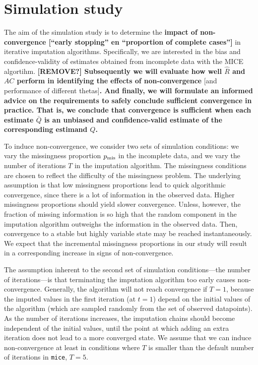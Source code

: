 \documentclass[Royal,times,sageh]{sagej}
\begin{document}
\hypertarget{simulation-study}{%
\section{Simulation study}\label{simulation-study}}

The aim of the simulation study is to determine the \textbf{impact of non-convergence {[}``early stopping'' en ``proportion of complete cases''{]}} in iterative imputation algorithms. Specifically, we are interested in the bias and confidence-validity of estimates obtained from incomplete data with the MICE algortihm. \textbf{{[}REMOVE?{]} Subsequently we will evaluate how well \(\widehat{R}\) and \(AC\) perform in identifying the effects of non-convergence }{[}and performance of different thetas{]}\textbf{. And finally, we will formulate an informed advice on the requirements to safely conclude sufficient convergence in practice. That is, we conclude that convergence is sufficient when each estimate \(\bar{Q}\) is an unbiased and confidence-valid estimate of the corresponding estimand \(Q\).}

To induce non-convergence, we consider two sets of simulation conditions: we vary the missingness proportion \(p_{\rm mis}\) in the incomplete data, and we vary the number of iterations \(T\) in the imputation algorithm. The missingness conditions are chosen to reflect the difficulty of the missingness problem. The underlying assumption is that low missingness proportions lead to quick algorithmic convergence, since there is a lot of information in the observed data. Higher missingness proportions should yield slower convergence. Unless, however, the fraction of missing information is so high that the random component in the imputation algorithm outweighs the information in the observed data. Then, convergence to a stable but highly variable state may be reached instantaneously. We expect that the incremental missingness proportions in our study will result in a corresponding increase in signs of non-convergence.

The assumption inherent to the second set of simulation conditions---the number of iterations---is that terminating the imputation algorithm too early causes non-convergence. Generally, the algorithm will not reach convergence if \(T=1\), because the imputed values in the first iteration (at \(t=1\)) depend on the initial values of the algorithm (which are sampled randomly from the set of observed datapoints). As the number of iterations increases, the imputation chains should become independent of the initial values, until the point at which adding an extra iteration does not lead to a more converged state. We assume that we can induce non-convergence at least in conditions where \(T\) is smaller than the default number of iterations in \texttt{mice}, \(T=5\).
\end{document}
